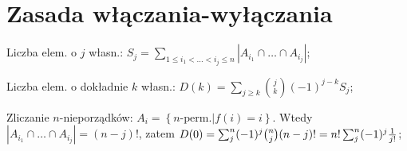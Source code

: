 \section{Zasada włączania-wyłączania}

Liczba elem. o $j$ własn.: $S_j =
  \sum_{1 \leq i_1 < \dots < i_j \leq n} |A_{i_1} \cap \dots \cap A_{i_j}|$;

Liczba elem. o dokładnie $k$ własn.:
  $D(k) = \sum_{j\geq k} \binom{j}{k} (-1)^{j-k}S_j$;

Zliczanie $n$-nieporządków: $A_i = \left\{n\text{-perm.} | f(i) = i \right\}$.
  Wtedy $|A_{i_1} \cap \dots \cap A_{i_j}| = (n-j)!$, zatem
  $D(0) = \sum^n_j(-1)^j\binom{n}{j}(n-j)!=n!\sum^n_j(-1)^j{1 \over j!}$;
